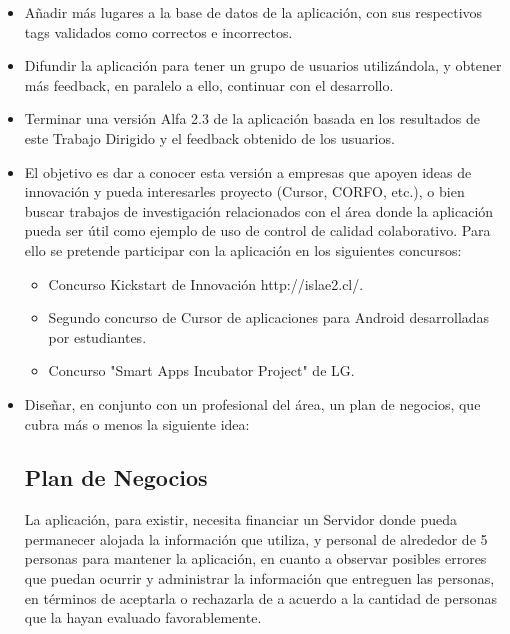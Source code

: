 \documentclass[10pt,letterpaper]{article}
\begin{document}
\begin{itemize}

\item Añadir más lugares a la base de datos de la aplicación, con sus respectivos tags validados como correctos e incorrectos.\\

\item Difundir la aplicación para tener un grupo de usuarios utilizándola, y obtener más feedback, en paralelo a ello, continuar con el desarrollo.\\

\item Terminar una versión Alfa 2.3 de la aplicación basada en los resultados de este Trabajo Dirigido y el feedback obtenido de los usuarios.\\

\item El objetivo es dar a conocer esta versión a empresas que apoyen ideas de innovación y pueda interesarles proyecto (Cursor, CORFO, etc.), o bien buscar trabajos de investigación relacionados con el área donde la aplicación pueda ser útil como ejemplo de uso de control de calidad colaborativo. Para ello se pretende participar con la aplicación en los siguientes concursos:\\

\begin{itemize}
\item Concurso Kickstart de Innovación http://islae2.cl/.
\item Segundo concurso de Cursor de aplicaciones para Android desarrolladas por estudiantes.
\item Concurso "Smart Apps Incubator Project" de LG.
\end{itemize}

\item Diseñar, en conjunto con un profesional del área, un plan de negocios, que cubra más o menos la siguiente idea:\\

\subsection{Plan de Negocios}

La aplicación, para existir, necesita financiar un Servidor donde pueda permanecer alojada la información que utiliza, y personal de alrededor de 5 personas para mantener la aplicación, en cuanto a observar posibles errores que puedan ocurrir y administrar la información que entreguen las personas, en términos de aceptarla o rechazarla de a acuerdo a la cantidad de personas que la hayan evaluado favorablemente.\\


\end{itemize}
\end{document}
